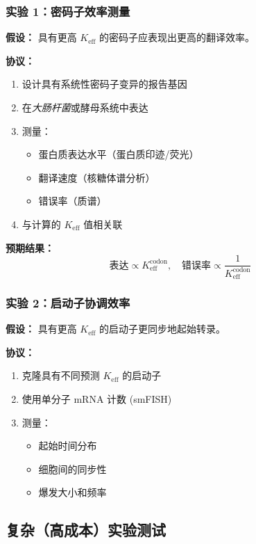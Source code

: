 \documentclass[12pt]{article}
\begin{document}
	\subsubsection{实验 1：密码子效率测量}
	\textbf{假设：} 具有更高 $K_{\text{eff}}$ 的密码子应表现出更高的翻译效率。
	
	\textbf{协议：}
	\begin{enumerate}
		\item 设计具有系统性密码子变异的报告基因
		\item 在\textit{大肠杆菌}或酵母系统中表达
		\item 测量：
		\begin{itemize}
			\item 蛋白质表达水平（蛋白质印迹/荧光）
			\item 翻译速度（核糖体谱分析）
			\item 错误率（质谱）
		\end{itemize}
		\item 与计算的 $K_{\text{eff}}$ 值相关联
	\end{enumerate}
	
	\textbf{预期结果：}
	\[
	\text{表达} \propto K_{\text{eff}}^{\text{codon}}, \quad \text{错误率} \propto \frac{1}{K_{\text{eff}}^{\text{codon}}}
	\]
	
	\subsubsection{实验 2：启动子协调效率}
	\textbf{假设：} 具有更高 $K_{\text{eff}}$ 的启动子更同步地起始转录。
	
	\textbf{协议：}
	\begin{enumerate}
		\item 克隆具有不同预测 $K_{\text{eff}}$ 的启动子
		\item 使用单分子 mRNA 计数 (smFISH)
		\item 测量：
		\begin{itemize}
			\item 起始时间分布
			\item 细胞间的同步性
			\item 爆发大小和频率
		\end{itemize}
	\end{enumerate}
	
	\subsection{复杂（高成本）实验测试}
	
\end{document}
